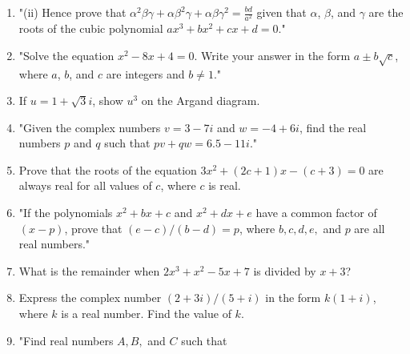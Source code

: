 \documentclass{article}
\begin{document}
\begin{enumerate}
(iii) \(\alpha\beta\gamma = -d/a\)"
\vspace{3cm}
\item "(ii) Hence prove that \(\alpha^2\beta\gamma + \alpha\beta^2\gamma + \alpha\beta\gamma^2 = \frac{bd}{a^2}\) given that \(\alpha\), \(\beta\), and \(\gamma\) are the roots of the cubic polynomial \(ax^3 + bx^2 + cx + d = 0\)."
\vspace{3cm}
\item "Solve the equation \(x^2 - 8x + 4 = 0\). Write your answer in the form \(a \pm b\sqrt{c}\), where \(a\), \(b\), and \(c\) are integers and \(b \neq 1\)."
\vspace{3cm}
\item If \( u = 1 + \sqrt{3}i \), show \( u^3 \) on the Argand diagram.
\vspace{3cm}
\item "Given the complex numbers \( v = 3 - 7i \) and \( w = -4 + 6i \), find the real numbers \( p \) and \( q \) such that \( pv + qw = 6.5 - 11i \)."
\vspace{3cm}
\item Prove that the roots of the equation \( 3x^2 + (2c + 1)x - (c + 3) = 0 \) are always real for all values of \( c \), where \( c \) is real.
\vspace{3cm}
\item "If the polynomials \(x^2 + bx + c\) and \(x^2 + dx + e\) have a common factor of \((x - p)\), prove that \((e - c) / (b - d) = p\), where \(b, c, d, e,\) and \(p\) are all real numbers."
\vspace{3cm}
\item What is the remainder when \(2x^3 + x^2 - 5x + 7\) is divided by \(x + 3\)?
\vspace{3cm}
\item Express the complex number \((2 + 3i) / (5 + i)\) in the form \(k(1 + i)\), where \(k\) is a real number. Find the value of \(k\).
\vspace{3cm}
\item "Find real numbers \( A, B, \) and \( C \) such that


\end{enumerate}
\end{document}
